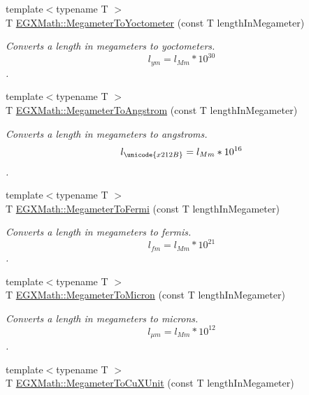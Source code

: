 \begin{DoxyCompactItemize}
{\footnotesize template$<$typename T $>$ }\\T \mbox{\hyperlink{group___e_g_x_math-_conversions-_length_conversions-_s_i-_megameter-_s_i_gac9b71989abb5a622818f01c5bdbe7285}{E\+G\+X\+Math\+::\+Megameter\+To\+Yoctometer}} (const T length\+In\+Megameter)
\begin{DoxyCompactList}\small\item\em Converts a length in megameters to yoctometers. \[ l_{ym}=l_{Mm} * 10^{30} \]. \end{DoxyCompactList}\item 
{\footnotesize template$<$typename T $>$ }\\T \mbox{\hyperlink{group___e_g_x_math-_conversions-_length_conversions-_s_i-_megameter-_non-_s_i_gac4c7e615f4ec3d000ac341a5bf9a79a0}{E\+G\+X\+Math\+::\+Megameter\+To\+Angstrom}} (const T length\+In\+Megameter)
\begin{DoxyCompactList}\small\item\em Converts a length in megameters to angstroms. \[ l_{\unicode{x212B}}=l_{Mm} * 10^{16} \]. \end{DoxyCompactList}\item 
{\footnotesize template$<$typename T $>$ }\\T \mbox{\hyperlink{group___e_g_x_math-_conversions-_length_conversions-_s_i-_megameter-_non-_s_i_ga74f07a7c24ffe784415fb3d33a3b5bec}{E\+G\+X\+Math\+::\+Megameter\+To\+Fermi}} (const T length\+In\+Megameter)
\begin{DoxyCompactList}\small\item\em Converts a length in megameters to fermis. \[ l_{fm}=l_{Mm} * 10^{21} \]. \end{DoxyCompactList}\item 
{\footnotesize template$<$typename T $>$ }\\T \mbox{\hyperlink{group___e_g_x_math-_conversions-_length_conversions-_s_i-_megameter-_non-_s_i_ga14e6b356b28257b1bde9cb9ebf6bc3c6}{E\+G\+X\+Math\+::\+Megameter\+To\+Micron}} (const T length\+In\+Megameter)
\begin{DoxyCompactList}\small\item\em Converts a length in megameters to microns. \[ l_{\mu m}=l_{Mm} * 10^{12} \]. \end{DoxyCompactList}\item 
{\footnotesize template$<$typename T $>$ }\\T \mbox{\hyperlink{group___e_g_x_math-_conversions-_length_conversions-_s_i-_megameter-_non-_s_i_gae44ce2fd3e740a5aec1546ed10c83447}{E\+G\+X\+Math\+::\+Megameter\+To\+Cu\+X\+Unit}} (const T length\+In\+Megameter)

\end{DoxyCompactItemize}
